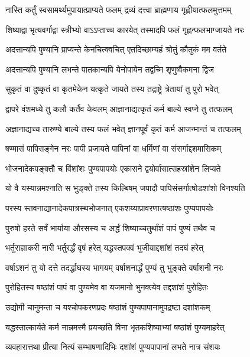 \twolineshloka
{नास्ति कर्तुं स्वसामर्थ्यमुपायात्प्राप्यते फलम्}
{द्रव्यं दत्त्वा ब्राह्मणाय गृह्णीयात्फलमुत्तमम्} %

\twolineshloka
{शिष्याद्वा भृत्यवर्गाद्वा स्त्रीभ्यो वाऽऽप्ताच्च कारयेत्}
{तस्मादपि फलं गृह्णन्फलभाग्जायते नरः} %


\twolineshloka
{अदत्तान्यपि पुण्यानि प्राप्यन्ते केनचित्क्वचित्}
{एतदिच्छाम्यहं श्रोतुं कौतुकं मम वर्तते} %


\twolineshloka
{अदत्तान्यपि पुण्यानि लभन्ते पातकान्यपि}
{येनोपायेन तद्वच्मि शृणुष्वैकमना द्विज} %

\twolineshloka
{सुकृतं वा दुष्कृतं वा कृतमेकेन यत्कृते}
{जायते तस्य तद्राष्ट्रे त्रेतायां तु पुरो भवेत्} %

\twolineshloka
{द्वापरे वंशमध्ये तु कलौ कर्तैव केवलम्}
{आज्ञानाद्यत्कृतं कर्म बाल्ये स्वप्ने तु तत्फलम्} %

\twolineshloka
{अज्ञानाद्यच्च तारुण्ये बाल्ये तस्य फलं भवेत्}
{ज्ञानपूर्वं कृतं कर्म आजन्मान्तं च तत्फलम्} %

\twolineshloka
{षण्मासं पापिसङ्गेन नरः पापी प्रजायते}
{पापिनां वा धर्मिणां वा संसर्गाद्दशमासिकम्} %

\twolineshloka
{भोजनादेकपङ्क्तौ च विंशांशः पुण्यपापयोः}
{एकासने द्वयोर्वासात्सहस्रांशेन लिप्यते} %

\twolineshloka
{यो वै यस्यान्नमश्नाति स भुङ्क्ते तस्य किल्बिषम्}
{जपादौ पापिसंसर्गात्षोडशांशो विनश्यति} %

\twolineshloka
{परस्य स्तवनाद्यानादेकपात्रस्थभोजनात्}
{एकशय्याप्रावरणात्षष्ठांशः पुण्यपापयोः} %

\twolineshloka
{पुरुषो हरते सर्वं भार्याया औरसस्य च}
{अर्द्धं शिष्याच्चतुर्थांशं पापं पुण्यं तथैव च} %

\twolineshloka
{भर्तुराज्ञाकरी नारी भर्तुरर्द्धं वृषं हरेत्}
{यद्धस्तपक्वं भुजीयाद्दशांशं तदघं हरेत्} %

\twolineshloka
{वर्षाऽशनं तु यो दत्ते तदर्द्धाघस्य भागयम्}
{वर्षाशनार्द्धं पुण्यं तु भुङ्क्ते वर्षाशनी नरः} %

\twolineshloka
{पुरोहितस्य षष्ठांशं पापं वा पुण्यमेव वा}
{यजमानो भुनक्त्येव तद्दशांशं पुरोहितः} %

\twolineshloka
{उद्योगी चानुमन्ता च यश्चोपकरणप्रदः}
{षष्ठांशं पुण्यपापानामुपद्रष्टा दशांशकम्} %

\twolineshloka
{यद्धस्तात्कार्यते कर्म नान्नमस्मै प्रयच्छति}
{विना भृतकशिष्याभ्यां षष्ठांशं पुण्यमाहरेत्} %

\twolineshloka
{व्यवहारात्तथा प्रीत्या नित्यं सम्भाषणादिभिः}
{दशांशं पुण्यपापानां लभते नात्र संशयः} %

